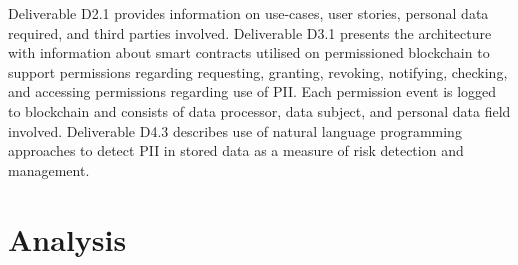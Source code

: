 Deliverable D2.1 \cite{noauthor_d2.1_2018} provides information on use-cases, user stories, personal data required, and third parties involved. Deliverable D3.1 \cite{noauthor_d3.1_2019} presents the architecture with information about smart contracts utilised on permissioned blockchain to support permissions regarding requesting, granting, revoking, notifying, checking, and accessing permissions regarding use of PII. Each permission event is logged to blockchain and consists of data processor, data subject, and personal data field involved. Deliverable D4.3 \cite{noauthor_d4.3_2019} describes use of natural language programming approaches to detect PII in stored data as a measure of risk detection and management.


\section{Analysis}\label{sec:sota:analysis}

